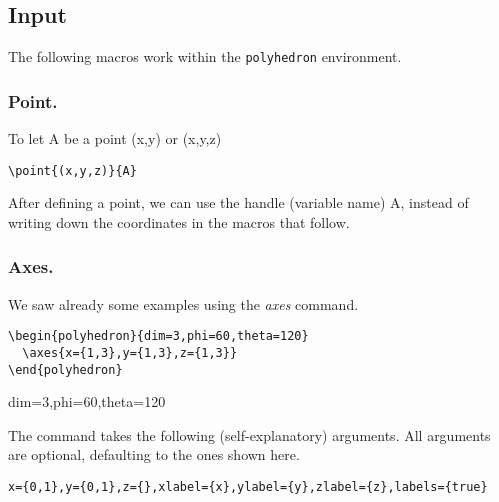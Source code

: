 \documentclass[a4paper]{article}
\begin{document}
\subsection{Input}

The following macros work within the \texttt{polyhedron} environment.

\subsubsection{Point.} To let A be a point (x,y) or (x,y,z)
\begin{lstlisting}
\point{(x,y,z)}{A}
\end{lstlisting}
After defining a point, we can use the handle (variable name) A, instead of
writing down the coordinates in the macros that follow.


\subsubsection{Axes.}

We saw already some examples using the \emph{axes} command.

\begin{center}
  \begin{minipage}{0.6\textwidth}
  \begin{lstlisting}
\begin{polyhedron}{dim=3,phi=60,theta=120}
  \axes{x={1,3},y={1,3},z={1,3}}
\end{polyhedron}
  \end{lstlisting}
  \end{minipage}
  \qquad\qquad
  \begin{minipage}{0.2\textwidth}
    \begin{polyhedron}{dim=3,phi=60,theta=120}
    \end{polyhedron}
  \end{minipage}
\end{center}

The command takes the following (self-explanatory) arguments.
All arguments are optional, defaulting to the ones shown here.

\begin{lstlisting}
x={0,1},y={0,1},z={},xlabel={x},ylabel={y},zlabel={z},labels={true}
\end{lstlisting}
\end{document}
